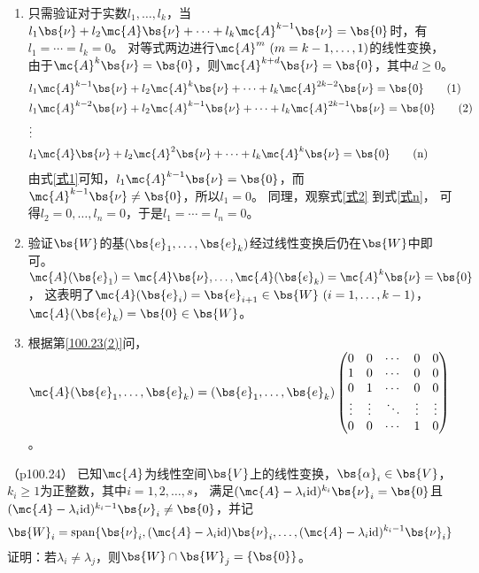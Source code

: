 \documentclass[12pt, a4paper, oneside, UTF8]{ctexbook}
\begin{document}
\begin{solution}
    \begin{enumerate}[label=(\arabic*)]
        \item 只需验证对于实数$l_1,\ldots,l_k$，当$l_1\bs{\nu}+l_2 \mc{A}\bs{\nu}+\cdots+l_k\mc{A}^{k-1}\bs{\nu} = \bs{0}$时，有$l_1=\cdots=l_k=0$。
        对等式两边进行$\mc{A}^m \ (m=k-1,\ldots,1)$的线性变换， 由于$\mc{A}^k\bs{\nu}=\bs{0}$，则$\mc{A}^{k+d}\bs{\nu}=\bs{0}$，其中$d \geq 0$。
        \begin{align*}
            &l_1\mc{A}^{k-1}\bs{\nu}+l_2\mc{A}^{k}\bs{\nu}+\cdots+l_k\mc{A}^{2k-2}\bs{\nu}=\bs{0}  \tag{1} \label{式1}\\
            &l_1\mc{A}^{k-2}\bs{\nu}+l_2\mc{A}^{k-1}\bs{\nu}+\cdots+l_k\mc{A}^{2k-1}\bs{\nu}=\bs{0}  \tag{2} \label{式2}\\
            &\vdots \notag \\
            &l_1\mc{A}\bs{\nu}+l_2\mc{A}^{2}\bs{\nu}+\cdots+l_k\mc{A}^{k}\bs{\nu}=\bs{0}  \tag{n} \label{式n}
        \end{align*}
        由式\eqref{式1}可知，$l_1\mc{A}^{k-1}\bs{\nu}=\bs{0}$，而$\mc{A}^{k-1}\bs{\nu} \neq \bs{0}$，所以$l_1=0$。
        同理，观察式\eqref{式2} 到式\eqref{式n}，
        可得$l_2=0,\ldots,l_n=0$，于是$l_1=\cdots=l_n=0$。
        \item 验证$\bs{W}$的基$(\bs{e}_1,\ldots,\bs{e}_k)$经过线性变换后仍在$\bs{W}$中即可。$\mc{A}(\bs{e}_1)=\mc{A}\bs{\nu},\ldots,\mc{A}(\bs{e}_k)=\mc{A}^{k}\bs{\nu}=\bs{0}$，
        这表明了$\mc{A}(\bs{e}_i)=\bs{e}_{i+1} \in \bs{W}\ (i=1,\ldots,k-1)$，$\mc{A}(\bs{e}_k)=\bs{0} \in \bs{W}$。\label{100.23(2)}
        \item 根据第\ref{100.23(2)}问，$\mc{A}(\bs{e}_1,\ldots,\bs{e}_k)=(\bs{e}_1,\ldots,\bs{e}_k)\begin{pmatrix}
            0 & 0 &\cdots& 0 & 0\\
            1 & 0 & \cdots& 0 & 0 \\
            0 & 1 &\cdots  & 0 & 0  \\
            \vdots& \vdots& \ddots &\vdots & \vdots \\
            0 & 0 & \cdots & 1 & 0
        \end{pmatrix}$。
    \end{enumerate}
\end{solution}

\begin{question}（p100.24）
已知$\mc{A}$为线性空间$\bs{V}$上的线性变换，$\bs{\alpha}_i \in \bs{V}$，$k_i \geq 1$为正整数，其中$i=1,2,\ldots,s$，
满足$(\mc{A}-\lambda_i \mathrm{id})^{k_i}\bs{\nu}_i = \bs{0}$且$(\mc{A}-\lambda_i \mathrm{id})^{k_i-1}\bs{\nu}_i \neq \bs{0}$，并记
\begin{align*}
    \bs{W}_i=\mathrm{span}\{\bs{\nu}_i,(\mc{A}-\lambda_i \mathrm{id})\bs{\nu}_i,\ldots,(\mc{A}-\lambda_i \mathrm{id})^{k_i-1}\bs{\nu}_i\}
\end{align*}
证明：若$\lambda_i \neq \lambda_j$，则$\bs{W} \cap \bs{W}_j =\{\bs{0}\}$。
\end{question}
\end{document}
